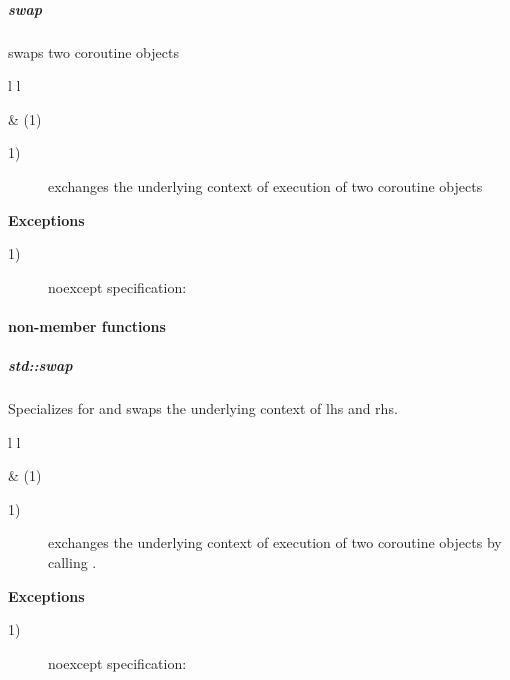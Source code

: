 \subparagraph*{swap}
swaps two coroutine objects\\

\begin{tabular}{ l l }
    \midrule

     & (1)\\

    \midrule
\end{tabular}

\begin{description}
    \item[1)] exchanges the underlying context of execution of two coroutine
              objects\\
\end{description}

{\bf Exceptions}
\begin{description}
    \item[1)] noexcept specification: \\
\end{description}

\paragraph*{non-member functions}
\subparagraph*{std::swap}
Specializes  for \callcoro and swaps the underlying context of
lhs and rhs.\\

\begin{tabular}{ l l }
    \midrule

     & (1)\\

    \midrule
\end{tabular}

\begin{description}
    \item[1)] exchanges the underlying context of execution of two coroutine
              objects by calling .\\
\end{description}

{\bf Exceptions}
\begin{description}
    \item[1)] noexcept specification: \\
\end{description}


